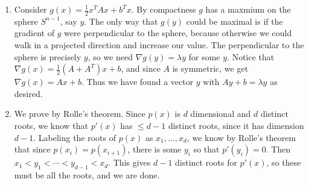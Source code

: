 \documentclass[12pt]{article}
\theoremstyle{definitionstyle}
\newcommand{\1}{\mathds 1}
\begin{document}
\begin{enumerate}
        \item Consider $g(x) = \frac 12 x^T Ax + b^Tx$. By compactness $g$ has a maxmium on the sphere $S^{n-1}$, say $y$. The only way that $g(y)$ could be maximal is if the gradient of $g$ were perpendicular to the sphere, because otherwise we could walk in a projected direction and increase our value. The perpendicular to the sphere is precisely $y$, so we need $\nabla g(y) = \lambda y$ for some $y$. Notice that $\nabla g(x) = \frac 12 (A+A^T)x + b$, and since $A$ is symmetric, we get $\nabla g(x) = Ax + b$. Thus we have found a vector $y$ with $Ay + b = \lambda y$ as desired.
        
        \item We prove by Rolle's theorem. Since $p(x)$ is $d$ dimensional and $d$ distinct roots, we know that $p'(x)$ has $\leq d-1$ distinct roots, since it has dimension $d-1$. Labeling the roots of $p(x)$ as $x_1, \ldots, x_d$, we know by Rolle's theorem that since $p(x_i) = p(x_{i+1})$, there is some $y_i$ so that $p'(y_i) = 0$. Then $x_1 < y_1 < \cdots < y_{d-1} < x_d$. This gives $d-1$ distinct roots for $p'(x)$, so these must be all the roots, and we are done.
    \end{enumerate}
\end{document}
